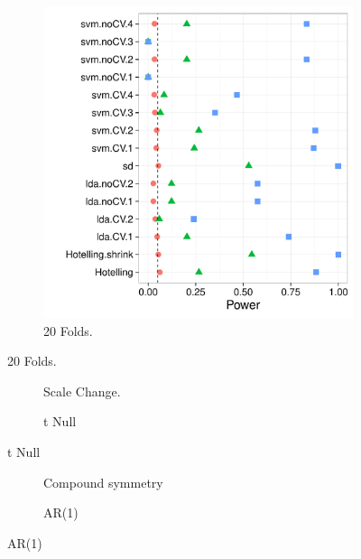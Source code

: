 \documentclass[12pt,a4paper]{article}
\begin{document}
\begin{figure}[h]
\begin{subfigure}{.5\textwidth}
	  \includegraphics[width=1\linewidth]{"art/2016-07-29 07:18:24"}
	  \caption{20 Folds.} %
	\end{subfigure}
\end{figure}


\begin{figure}[h]
\centering
\caption{\footnotesize [TODO].}	
	\begin{subfigure}{.5\textwidth}
	  \centering
	  \caption{Scale Change.}  %
	\end{subfigure}%
	\begin{subfigure}{.5\textwidth}
	  \centering
	  \caption{t Null} %
	\end{subfigure}
\end{figure}



\begin{figure}[h]
\centering
\caption{\footnotesize [TODO].}	
	\begin{subfigure}{.5\textwidth}
	  \centering
	  \caption{Compound symmetry}  
	\end{subfigure}%
	\begin{subfigure}{.5\textwidth}
	  \centering
	  \caption{AR(1)} %
	\end{subfigure}
\end{figure}
\end{document}
